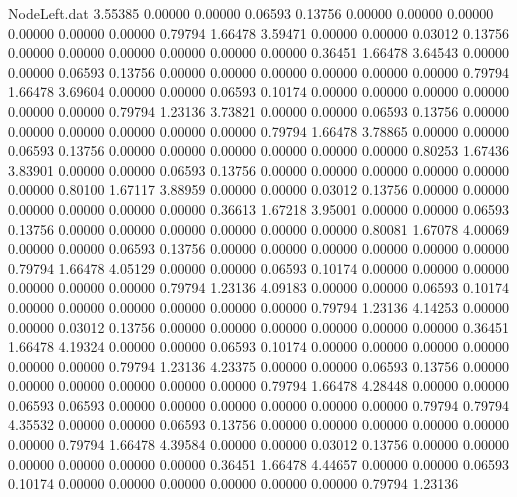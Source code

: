 \begin{filecontents}{NodeLeft.dat}
   3.55385    0.00000    0.00000     0.06593    0.13756    0.00000    0.00000    0.00000    0.00000    0.00000    0.00000    0.79794    1.66478
   3.59471    0.00000    0.00000     0.03012    0.13756    0.00000    0.00000    0.00000    0.00000    0.00000    0.00000    0.36451    1.66478
   3.64543    0.00000    0.00000     0.06593    0.13756    0.00000    0.00000    0.00000    0.00000    0.00000    0.00000    0.79794    1.66478
   3.69604    0.00000    0.00000     0.06593    0.10174    0.00000    0.00000    0.00000    0.00000    0.00000    0.00000    0.79794    1.23136
   3.73821    0.00000    0.00000     0.06593    0.13756    0.00000    0.00000    0.00000    0.00000    0.00000    0.00000    0.79794    1.66478
   3.78865    0.00000    0.00000     0.06593    0.13756    0.00000    0.00000    0.00000    0.00000    0.00000    0.00000    0.80253    1.67436
   3.83901    0.00000    0.00000     0.06593    0.13756    0.00000    0.00000    0.00000    0.00000    0.00000    0.00000    0.80100    1.67117
   3.88959    0.00000    0.00000     0.03012    0.13756    0.00000    0.00000    0.00000    0.00000    0.00000    0.00000    0.36613    1.67218
   3.95001    0.00000    0.00000     0.06593    0.13756    0.00000    0.00000    0.00000    0.00000    0.00000    0.00000    0.80081    1.67078
   4.00069    0.00000    0.00000     0.06593    0.13756    0.00000    0.00000    0.00000    0.00000    0.00000    0.00000    0.79794    1.66478
   4.05129    0.00000    0.00000     0.06593    0.10174    0.00000    0.00000    0.00000    0.00000    0.00000    0.00000    0.79794    1.23136
   4.09183    0.00000    0.00000     0.06593    0.10174    0.00000    0.00000    0.00000    0.00000    0.00000    0.00000    0.79794    1.23136
   4.14253    0.00000    0.00000     0.03012    0.13756    0.00000    0.00000    0.00000    0.00000    0.00000    0.00000    0.36451    1.66478
   4.19324    0.00000    0.00000     0.06593    0.10174    0.00000    0.00000    0.00000    0.00000    0.00000    0.00000    0.79794    1.23136
   4.23375    0.00000    0.00000     0.06593    0.13756    0.00000    0.00000    0.00000    0.00000    0.00000    0.00000    0.79794    1.66478
   4.28448    0.00000    0.00000     0.06593    0.06593    0.00000    0.00000    0.00000    0.00000    0.00000    0.00000    0.79794    0.79794
   4.35532    0.00000    0.00000     0.06593    0.13756    0.00000    0.00000    0.00000    0.00000    0.00000    0.00000    0.79794    1.66478
   4.39584    0.00000    0.00000     0.03012    0.13756    0.00000    0.00000    0.00000    0.00000    0.00000    0.00000    0.36451    1.66478
   4.44657    0.00000    0.00000     0.06593    0.10174    0.00000    0.00000    0.00000    0.00000    0.00000    0.00000    0.79794    1.23136

\end{filecontents}
